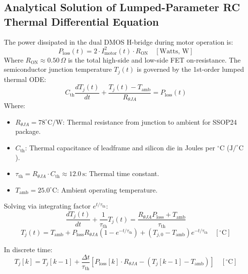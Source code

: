 \documentclass[11pt, a4paper]{article}
\begin{document}
\subsection{Analytical Solution of Lumped-Parameter RC Thermal Differential Equation}
The power dissipated in the dual DMOS H-bridge during motor operation is:
\begin{equation}
    P_{\text{loss}}(t) = 2 \cdot I_{\text{motor}}^2(t) \cdot R_{\text{ON}} \quad [\text{Watts, W}]
\end{equation}
Where $R_{\text{ON}} \approx 0.50\,\Omega$ is the total high-side and low-side FET on-resistance. The semiconductor junction temperature $T_j(t)$ is governed by the 1st-order lumped thermal ODE:
\begin{equation}
    C_{\text{th}} \frac{d T_j(t)}{dt} + \frac{T_j(t) - T_{\text{amb}}}{R_{\theta JA}} = P_{\text{loss}}(t)
\end{equation}
Where:
\begin{itemize}
    \item $R_{\theta JA} = 78^\circ\text{C/W}$: Thermal resistance from junction to ambient for SSOP24 package.
    \item $C_{\text{th}}$: Thermal capacitance of leadframe and silicon die in Joules per $^\circ\text{C}$ ($\text{J/}^\circ\text{C}$).
    \item $\tau_{\text{th}} = R_{\theta JA} \cdot C_{\text{th}} \approx 12.0\,\text{s}$: Thermal time constant.
    \item $T_{\text{amb}} = 25.0^\circ\text{C}$: Ambient operating temperature.
\end{itemize}

Solving via integrating factor $e^{t/\tau_{\text{th}}}$:
\begin{equation}
    \frac{d T_j(t)}{dt} + \frac{1}{\tau_{\text{th}}} T_j(t) = \frac{R_{\theta JA} P_{\text{loss}} + T_{\text{amb}}}{\tau_{\text{th}}}
\end{equation}
\begin{equation}
    T_j(t) = T_{\text{amb}} + P_{\text{loss}} R_{\theta JA} \left(1 - e^{-t / \tau_{\text{th}}}\right) + (T_{j,0} - T_{\text{amb}}) e^{-t / \tau_{\text{th}}} \quad [^\circ\text{C}]
\end{equation}

In discrete time:
\begin{equation}
    T_j[k] = T_j[k-1] + \frac{\Delta t}{\tau_{\text{th}}} \left[ P_{\text{loss}}[k] \cdot R_{\theta JA} - (T_j[k-1] - T_{\text{amb}}) \right] \quad [^\circ\text{C}]
\end{equation}
\end{document}
